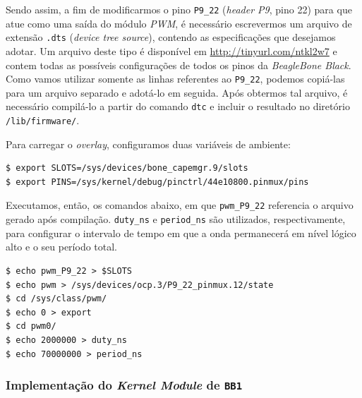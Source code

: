 Sendo assim, a fim de modificarmos o pino \texttt{P9\_22} (\textit{header P9},
pino 22) para que atue como uma saída do módulo \textit{PWM}, é necessário
escrevermos um arquivo de extensão \texttt{.dts} (\textit{device tree source}), contendo as especificações que
desejamos adotar. Um arquivo deste tipo é disponível em
\url{http://tinyurl.com/ntkl2w7} e contem todas as possíveis configurações de
todos os pinos da \textit{BeagleBone Black}. Como vamos utilizar somente as
linhas referentes ao \texttt{P9\_22}, podemos copiá-las para um arquivo
separado e adotá-lo em seguida. Após obtermos tal arquivo, é necessário
compilá-lo a partir do comando \texttt{dtc} e incluir o resultado no diretório
\texttt{/lib/firmware/}. 

\vspace{12pt}

Para carregar o \textit{overlay}, configuramos duas variáveis de ambiente:

\begin{lstlisting}[keywordstyle=\ttfamily, style=nonumbers]
$ export SLOTS=/sys/devices/bone_capemgr.9/slots
$ export PINS=/sys/kernel/debug/pinctrl/44e10800.pinmux/pins
\end{lstlisting}

\vspace{12pt}

Executamos, então, os comandos abaixo, em que \texttt{pwm\_P9\_22} referencia o
arquivo gerado após compilação. \texttt{duty\_ns} e \texttt{period\_ns}
são utilizados, respectivamente, para configurar o intervalo de tempo em que a
onda permanecerá em nível lógico alto e o seu período total.

\begin{lstlisting}[keywordstyle=\ttfamily, style=nonumbers]
$ echo pwm_P9_22 > $SLOTS
$ echo pwm > /sys/devices/ocp.3/P9_22_pinmux.12/state
$ cd /sys/class/pwm/
$ echo 0 > export 
$ cd pwm0/
$ echo 2000000 > duty_ns
$ echo 70000000 > period_ns
\end{lstlisting}

\subsubsection{Implementação do \textit{Kernel Module} de \texttt{BB1}}

